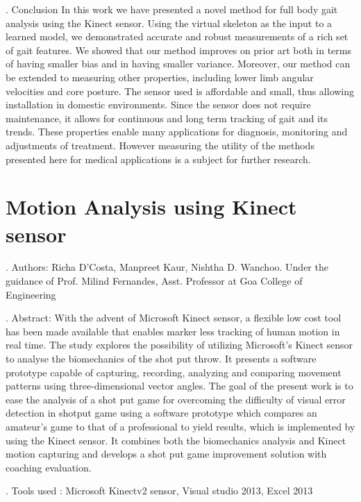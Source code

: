 . Conclusion
\noindent In this work we have presented a novel method for full body gait analysis using the Kinect sensor. Using the virtual skeleton as the input to a learned model, we demonstrated accurate and robust measurements of a rich set of gait features. We showed that our method improves on prior art both in terms of having smaller bias and in having smaller variance. Moreover, our method can be extended to measuring other properties, including lower limb angular velocities and core posture. The sensor used is affordable and small, thus allowing installation in domestic environments. Since the sensor does not require maintenance, it allows for continuous and long term tracking of gait and its trends. These properties enable many applications for diagnosis, monitoring and adjustments of treatment. However measuring the utility of the methods presented here for medical applications is a subject for further research.
\newpage

\section{Motion Analysis using Kinect sensor} \label{Motion Analysis using Kinect sensor}

. Authors:
\noindent Richa D’Costa, Manpreet Kaur, Nishtha D. Wanchoo. Under the guidance of Prof. Milind Fernandes, Asst. Professor at Goa College of Engineering

. Abstract:
\noindent With the advent of Microsoft Kinect sensor, a flexible low cost tool has been made available that enables marker less tracking of human motion in real time. The study explores the possibility of utilizing Microsoft’s Kinect sensor to analyse the biomechanics of the shot put throw. It presents a software prototype capable of capturing, recording, analyzing and comparing movement patterns using three-dimensional vector angles. The goal of the present work is to ease the analysis of a shot put game for overcoming the difficulty of visual error detection in shotput game using a software prototype which compares an amateur’s game to that of a professional to yield results, which is implemented by using the Kinect sensor. It combines both the biomechanics analysis and Kinect motion capturing and develops a shot put game improvement solution with coaching evaluation.

. Tools used :
\noindent Microsoft Kinectv2 sensor, Visual studio 2013, Excel 2013

